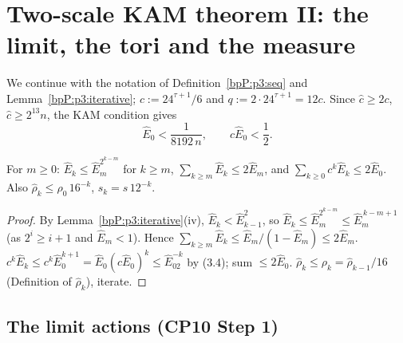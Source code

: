 \section{Two-scale KAM theorem II: the limit, the tori and the measure}\label{bpP:p3b}

We continue with the notation of Definition~\ref{bpP:p3:seq} and Lemma~\ref{bpP:p3:iterative}; $c:=24^{\tau+1}/6$ and $q:=2\cdot24^{\tau+1}=12c$. Since $\hat c\ge2c$, $\hat c\ge2^{13}n$, the KAM condition gives
\[\hat E_0<\frac1{8192\,n},\qquad c\hat E_0<\frac12.\tag{3.4}\]

\begin{lemma}[Sums]\label{bpP:p3:sums}
For $m\ge0$: $\hat E_k\le\hat E_m^{2^{k-m}}$ for $k\ge m$, $\sum_{k\ge m}\hat E_k\le2\hat E_m$, and $\sum_{k\ge0}c^k\hat E_k\le2\hat E_0$. Also $\hat\rho_k\le\hat\rho_0\,16^{-k}$, $s_k=s\,12^{-k}$.
\end{lemma}
\begin{proof}
\label{stepP:p3:sum-doubling}
By Lemma~\ref{bpP:p3:iterative}(iv), $\hat E_{k}<\hat E_{k-1}^2$, so $\hat E_k\le\hat E_m^{2^{k-m}}\le\hat E_m^{\,k-m+1}$ (as $2^{i}\ge i+1$ and $\hat E_m<1$). Hence $\sum_{k\ge m}\hat E_k\le\hat E_m/(1-\hat E_m)\le2\hat E_m$.
\label{stepP:p3:sum-weighted}
$c^k\hat E_k\le c^k\hat E_0^{k+1}=\hat E_0(c\hat E_0)^k\le\hat E_02^{-k}$ by (3.4); sum $\le2\hat E_0$.
\label{stepP:p3:sum-radii}
$\hat\rho_k\le\rho_k=\hat\rho_{k-1}/16$ (Definition of $\hat\rho_k$), iterate.
\end{proof}

\subsection{The limit actions (CP10 Step 1)}\label{bpP:p3:limit}

